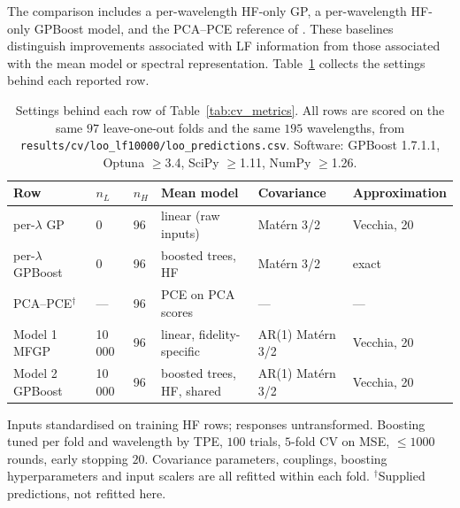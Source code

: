 \documentclass[12pt, letterpaper, oneside]{article}
\begin{document}
The comparison includes a per-wavelength HF-only GP, a per-wavelength
HF-only GPBoost model, and the PCA--PCE reference of
\citet{Nussbaumer2026}. These baselines distinguish improvements associated
with LF information from those associated with the mean model or spectral
representation. Table~\ref{tab:run_spec} collects the settings behind each
reported row.

\begin{table}[t]
  \centering
  \small
  \setlength{\tabcolsep}{4pt}
  \caption{Settings behind each row of Table~\ref{tab:cv_metrics}. All rows
  are scored on the same $97$ leave-one-out folds and the same $195$
  wavelengths, from
  \texttt{results/cv/loo\_lf10000/loo\_predictions.csv}. Software: GPBoost
  1.7.1.1, Optuna $\ge$3.4, SciPy $\ge$1.11, NumPy $\ge$1.26.}
  \label{tab:run_spec}
  \begin{tabular}{llllll}
    \toprule
    Row & $n_L$ & $n_H$ & Mean model & Covariance & Approximation \\
    \midrule
    per-$\lambda$ GP        & 0      & 96 & linear (raw inputs) & Matérn 3/2 & Vecchia, 20 \\
    per-$\lambda$ GPBoost   & 0      & 96 & boosted trees, HF   & Matérn 3/2 & exact \\
    PCA--PCE$^{\dagger}$    & ---    & 96 & PCE on PCA scores   & ---        & --- \\
    Model 1 MFGP            & 10\,000 & 96 & linear, fidelity-specific & AR(1) Matérn 3/2 & Vecchia, 20 \\
    Model 2 GPBoost         & 10\,000 & 96 & boosted trees, HF, shared & AR(1) Matérn 3/2 & Vecchia, 20 \\
    \bottomrule
  \end{tabular}

  \vspace{3pt}
  \begin{minipage}{0.95\textwidth}
    \footnotesize
    Inputs standardised on training HF rows; responses untransformed.
    Boosting tuned per fold and wavelength by TPE, $100$ trials, $5$-fold CV
    on MSE, $\le1000$ rounds, early stopping $20$. Covariance parameters,
    couplings, boosting hyperparameters and input scalers are all refitted
    within each fold. $^{\dagger}$Supplied predictions, not refitted here.
  \end{minipage}
\end{table}
\end{document}
